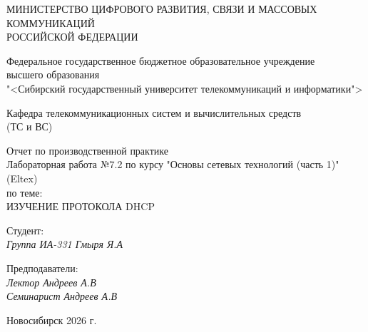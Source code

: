 \thispagestyle{empty}

\begin{center}
    МИНИСТЕРСТВО ЦИФРОВОГО РАЗВИТИЯ, СВЯЗИ И МАССОВЫХ КОММУНИКАЦИЙ \\ РОССИЙСКОЙ ФЕДЕРАЦИИ

    \vspace{20pt}

    Федеральное государственное бюджетное образовательное учреждение  \\  высшего образования \\
    "<Сибирский государственный университет телекоммуникаций и информатики"> \\

    \vspace{20pt}

    Кафедра телекоммуникационных систем и вычислительных средств \\  (ТС и ВС)
\end{center}

\vfill

\begin{center}
    Отчет по производственной практике \\  
    Лабораторная работа №7.2 по курсу "Основы сетевых технологий (часть 1)" (Eltex) \\
    \vspace{20pt}
    по теме: \\
    \uppercase{Изучение протокола DHCP}
\end{center}

\vfill

    \noindent Студент: \\
    \textit{Группа ИА-331 \hfill Гмыря Я.А} 

    \vspace{20pt}
 
    \noindent Предподаватели: \\
    \textit{Лектор \hfill Андреев А.В} \\
    \textit{Семинарист \hfill Андреев А.В}

\vfill

\begin{center}
    Новосибирск 2026 г.
\end{center}